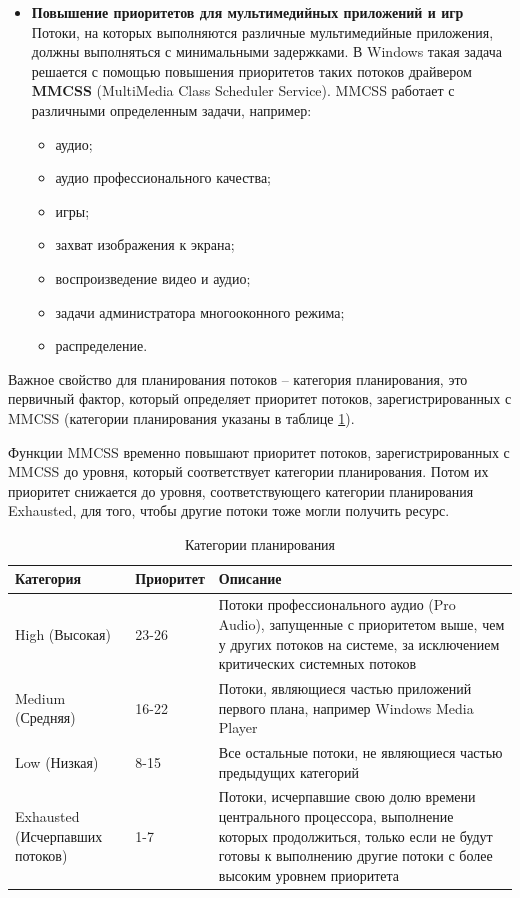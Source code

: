 \documentclass[a4paper,14pt,russian]{extreport}
\begin{document}
\begin{itemize}
		\item \textbf{Повышение приоритетов для мультимедийных приложений и игр}
		Потоки, на которых выполняются различные мультимедийные приложения, должны выполняться с минимальными задержками.
		В Windows такая задача решается с помощью повышения приоритетов таких потоков драйвером \textbf{MMCSS} (MultiMedia Class Scheduler Service).
		MMCSS работает с различными определенным задачи, например:
		\begin{itemize}
			\item аудио;
			\item аудио профессионального качества;
			\item игры;
			\item захват изображения к экрана;
			\item воспроизведение видео и аудио;
			\item задачи администратора многооконного режима;
			\item распределение.
		\end{itemize}
	\end{itemize}

	Важное свойство для планирования потоков – категория планирования, это первичный фактор, который определяет приоритет потоков, зарегистрированных с MMCSS (категории планирования указаны в таблице \ref{tab:plan}).
	
	Функции MMCSS временно повышают приоритет потоков, зарегистрированных с MMCSS до уровня, который соответствует категории планирования.
	Потом их приоритет снижается до уровня, соответствующего категории планирования Exhausted, для того, чтобы другие потоки тоже могли получить ресурс.
	
	\begin{table}[H]
		\caption{Категории планирования}
		\begin{center}
			\begin{tabular}{|p{40mm}|p{30mm}|p{80mm}|}
				\hline
				\textbf{Категория} & \textbf{Приоритет} & \textbf{Описание} \\
				\hline
				High (Высокая) & 23-26 & Потоки профессионального аудио (Pro Audio), запущенные с приоритетом выше, чем у других потоков на системе, за исключением критических системных потоков \\
				\hline
				Medium (Средняя) & 16-22 & Потоки, являющиеся частью приложений первого плана, например Windows Media Player \\
				\hline
				Low (Низкая) & 8-15 & Все остальные потоки, не являющиеся частью предыдущих категорий \\
				\hline
				Exhausted (Исчерпавших потоков) & 1-7 & Потоки, исчерпавшие свою долю времени центрального процессора, выполнение которых продолжиться, только если не будут готовы к выполнению другие потоки с более высоким уровнем приоритета \\
				\hline
			\end{tabular}
		\end{center}
		\label{tab:plan}
	\end{table}
\end{document}
